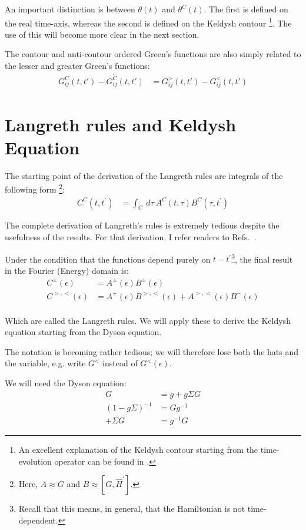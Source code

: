 An important distinction is between $\theta (t)$ and $\theta^C(t)$. The first is defined on the real time-axis, whereas the second is defined on the Keldysh contour \footnote{An excellent explanation of the Keldysh contour starting from the time-evolution operator can be found in \citet{diventra}.}. The use of this will become more clear in the next section. 

The contour and anti-contour ordered Green's functions are also simply related to the lesser and greater Green's functions:
\begin{align*}
G^C_{ij}(t,t') - G^{\tilde{C}}_{ij}(t,t') &= G^>_{ij}(t,t') - G^<_{ij}(t,t')
\end{align*}

\section{Langreth rules and Keldysh Equation}
The starting point of the derivation of the Langreth rules are integrals of the following form \footnote{Here, $A \approx G$ and $B \approx [G, \widehat{H}^\prime]$.}:
\begin{align*}
C^C(t,t^\prime) &= \int_C\:d\tau\:A^C(t,\tau) B^C (\tau, t^\prime)
\end{align*}

The complete derivation of Langreth's rules is extremely tedious despite the usefulness of the results. For that derivation, I refer readers to Refs.~\cite{mattuck,haugjauho}.
 
Under the condition that the functions depend purely on $t-t^\prime$\footnote{Recall that this means, in general, that the Hamiltonian is not time-dependent.}, the final result in the Fourier (Energy) domain is:
\begin{align*}
C^\pm (\epsilon) &= 
A^\pm (\epsilon) 
B^\pm (\epsilon) \\
C^{>,<} (\epsilon) &= 
A^+ (\epsilon) 
B^{>,<} (\epsilon) + 
A^{>,<} (\epsilon) 
B^- (\epsilon) \\
\end{align*}

Which are called the Langreth rules. We will apply these to derive the Keldysh equation starting from the Dyson equation.
 
The notation is becoming rather tedious; we will therefore lose both the hats and the variable, e.g. write $G^<$ instead of $G^<(\epsilon)$.

We will need the Dyson equation:
\begin{align*}
G &= g + g\Sigma G \\
(1 - g\Sigma)^{-1} &=G  g^{-1} \\
+ \Sigma G &= g^{-1} G
\end{align*}

